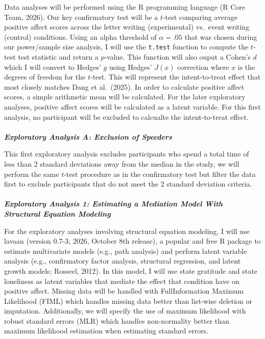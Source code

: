 \documentclass[
  letterpaper,
  DIV=11,
  numbers=noendperiod]{scrartcl}
\makeatletter
\let\oldparagraph\paragraph
\renewcommand{\paragraph}{
    \@ifstar
      \xxxParagraphStar
      \xxxParagraphNoStar
  }
\newcommand{\xxxParagraphStar}[1]{\oldparagraph*{#1}\mbox{}}
\newcommand{\xxxParagraphNoStar}[1]{\oldparagraph{#1}\mbox{}}
\makeatother
\begin{document}
Data analyses will be performed using the R programming language (R Core
Team, 2026). Our key confirmatory test will be a \(t\)-test comparing
average positive affect scores across the letter writing (experimental)
vs.~event writing (control) conditions. Using an alpha threshold of
\(\alpha = .05\) that was chosen during our power/sample size analysis,
I will use the \texttt{t.test} function to compute the \(t\)-test test
statistic and return a \(p\)-value. This function will also ouput a
Cohen's \(d\) which I will convert to Hedges' \(g\) using Hedges'
\(J(x)\) correction where \(x\) is the degrees of freedom for the
\(t\)-test. This will represent the intent-to-treat effect that most
closely matches Dang et al.~(2025). In order to calculate positive
affect scores, a simple arithmetic mean will be calculated. For the
later exploratory analyses, positive affect scores will be calculated as
a latent variable. For this first analysis, no participant will be
excluded to calcualte the intent-to-treat effect.

\paragraph{\texorpdfstring{\textbf{\emph{Exploratory Analysis A:
Exclusion of
Speeders}}}{Exploratory Analysis A: Exclusion of Speeders}}\label{exploratory-analysis-a-exclusion-of-speeders}

This first exploratory analysis excludes participants who spend a total
time of less than 2 standard deviations away from the median in the
study, we will perform the same \(t\)-test procedure as in the
confirmatory test but filter the data first to exclude participants that
do not meet the 2 standard deviation criteria.

\paragraph{\texorpdfstring{\textbf{\emph{Exploratory Analysis 1:
Estimating a Mediation Model With Structural Equation
Modeling}}}{Exploratory Analysis 1: Estimating a Mediation Model With Structural Equation Modeling}}\label{exploratory-analysis-1-estimating-a-mediation-model-with-structural-equation-modeling}

For the exploratory analyses involving structural equation modeling, I
will use lavaan (version 0.7-3; 2026, October 8th release), a popular
and free R package to estimate multivariate models (e.g., path analysis)
and perform latent variable analysis (e.g., confirmatory factor
analysis, structural regression, and latent growth models; Rosseel,
2012). In this model, I will use state gratitude and state loneliness as
latent variables that mediate the effect that condition have on positive
affect. Missing data will be handled with FullInformation Maximum
Likelihood (FIML) which handles missing data better than list-wise
deletion or imputation. Additionally, we will specify the use of maximum
likelihood with robust standard errors (MLR) which handles non-normality
better than maximum likelihood estimation when estimating standard
errors.
\end{document}

